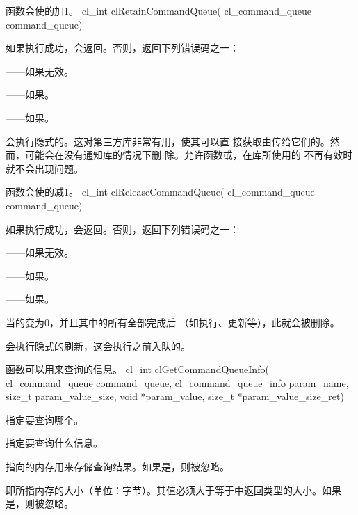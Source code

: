 函数会使的加1。
\startclc
cl_int clRetainCommandQueue(
		cl_command_queue command_queue)
\stopclc

如果执行成功，会返回。否则，返回下列错误码之一：
\startigBase
\item {}——如果无效。
\item {}——如果\scdevfailres。
\item {}——如果\schostfailres。
\stopigBase

会执行隐式的。这对第三方库非常有用，使其可以直
接获取由传给它们的。然而，可能会在没有通知库的情况下删
除。允许函数或，在库所使用的
不再有效时就不会出现问题。

函数会使的减1。
\startclc
cl_int clReleaseCommandQueue(
		cl_command_queue command_queue)
\stopclc

如果执行成功，会返回。否则，返回下列错误码之一：
\startigBase
\item {}——如果无效。
\item {}——如果\scdevfailres。
\item {}——如果\schostfailres。
\stopigBase

当的变为0，并且其中的所有全部完成后
（如执行、更新等），此就会被删除。

会执行隐式的刷新，这会执行之前入队的\scopencl{}。

函数可以用来查询的信息。
\startclc
cl_int clGetCommandQueueInfo(
		cl_command_queue command_queue,
		cl_command_queue_info param_name,
		size_t param_value_size,
		void *param_value,
		size_t *param_value_size_ret)
\stopclc

指定要查询哪个。

指定要查询什么信息。

指向的内存用来存储查询结果。如果是，则被忽略。

即所指内存的大小（单位：字节）。其值必须大于等于中返回类型的大小。如果是，则被忽略。

